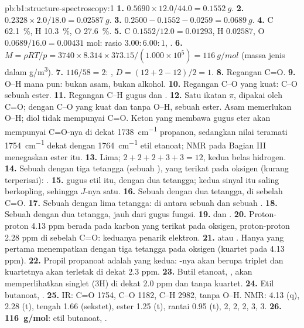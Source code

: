 \begin{solution}{pb:b1:structure-spectroscopy:1}
\textbf{1.} $0.5690 \times 12.0/44.0 = \qty{0.1552}{g}$.
\textbf{2.} $0.2328 \times 2.0/18.0 = \qty{0.02587}{g}$.
\textbf{3.} $0.2500 - 0.1552 - 0.0259 = \qty{0.0689}{g}$.
\textbf{4.} C \qty{62.1}{\percent}, H \qty{10.3}{\percent}, O
\qty{27.6}{\percent}.
\textbf{5.} C $0.1552/12.0 = 0.01293$, H $0.02587$, O $0.0689/16.0 =
0.00431$ mol: rasio $3.00 : 6.00 : 1$, .
\textbf{6.} $M = \rho RT/p = 3740 \times 8.314 \times 373.15/(1.000 \times 10^5) =
\qty{116}{g/mol}$ (massa jenis dalam \unit{g/m^3}).
\textbf{7.} $116/58 = 2$: , $D = (12 + 2 - 12)/2 = 1$.
\textbf{8.} Regangan C=O.
\textbf{9.} O--H mana pun: bukan asam, bukan alkohol.
\textbf{10.} Regangan C--O yang kuat: C--O sebuah ester.
\textbf{11.} Regangan C--H gugus  dan .
\textbf{12.} Satu ikatan $\pi$, dipakai oleh C=O; dengan C--O yang kuat
dan tanpa O--H, sebuah ester. Asam memerlukan O--H; diol tidak
mempunyai C=O. Keton yang membawa gugus eter akan mempunyai C=O-nya di
dekat \qty{1738}{cm^{-1}} propanon, sedangkan nilai teramati
\qty{1754}{cm^{-1}} dekat dengan \qty{1764}{cm^{-1}} etil etanoat; NMR
pada Bagian III menegaskan ester itu.
\textbf{13.} Lima; $2 + 2 + 2 + 3 + 3 = 12$, kedua belas hidrogen.
\textbf{14.} Sebuah  dengan tiga tetangga (sebuah ), yang
terikat pada oksigen (kurang terperisai): .
\textbf{15.}  gugus etil itu, dengan dua tetangga; kedua sinyal
itu saling berkopling, sehingga $J$-nya satu.
\textbf{16.} Sebuah  dengan dua tetangga, di sebelah C=O.
\textbf{17.} Sebuah  dengan lima tetangga: di antara sebuah
 dan sebuah .
\textbf{18.} Sebuah  dengan dua tetangga, jauh dari gugus fungsi.
\textbf{19.}  dan .
\textbf{20.} Proton-proton 4.13 ppm berada pada karbon yang terikat pada
oksigen, proton-proton 2.28 ppm di sebelah C=O: keduanya penarik
elektron.
\textbf{21.}  atau .
Hanya yang pertama menempatkan  dengan tiga tetangga pada oksigen
(kuartet pada 4.13 ppm).
\textbf{22.} Propil propanoat adalah yang kedua: -nya akan
berupa triplet dan kuartetnya akan terletak di dekat 2.3 ppm.
\textbf{23.} Butil etanoat, , akan memperlihatkan singlet
(3H) di dekat 2.0 ppm dan tanpa kuartet.
\textbf{24.} Etil butanoat, .
\textbf{25.} IR: C=O 1754, C--O 1182, C--H 2982, tanpa O--H. NMR: 
4.13 (q),  2.28 (t),  tengah 1.66 (sekstet), 
ester 1.25 (t),  rantai 0.95 (t),  2, 2, 2, 3, 3.
\textbf{26.} \textbf{\qty{116}{g/mol}}: etil butanoat, .
\end{solution}
